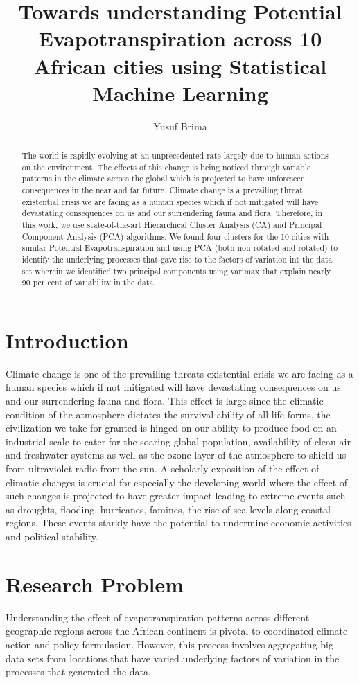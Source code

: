 \documentclass[12pt,a4paper]{article}
\author{Yusuf Brima}
\title{Towards understanding Potential Evapotranspiration across 10 African cities using Statistical Machine Learning}
\begin{document}
\maketitle
\thispagestyle{empty}
\pagebreak
\begin{abstract}
The world is rapidly evolving at an unprecedented rate largely due to human actions on the environment. The effects of  this  change is being noticed through variable patterns in the climate across the global which is projected to have unforeseen consequences in the near and far future. Climate change is a prevailing threat existential crisis we are facing as a human species which if not mitigated will have devastating consequences on us and our surrendering fauna and flora. Therefore,  in this work,  we use state-of-the-art Hierarchical Cluster Analysis (CA) and Principal Component Analysis (PCA) algorithms. We found four clusters for the 10 cities with similar Potential Evapotranspiration and using PCA (both non rotated and rotated) to identify the underlying processes that gave rise to the factors of variation int the data set wherein we identified two principal components using varimax that explain nearly 90 per cent of variability in the data. 
\end{abstract}
\pagebreak
\tableofcontents
\pagebreak
\section{Introduction}
Climate change is one of the prevailing threats existential crisis we are facing as a human species which if not mitigated will have devastating consequences on us and our surrendering fauna and flora. This effect is large since the climatic condition of the atmosphere dictates the survival ability of all life forms, the civilization we take for granted is hinged on our ability to produce food on an industrial scale to cater for the soaring global population, availability of clean air and freshwater systems as well as the ozone layer of the atmosphere to shield us from ultraviolet radio from the sun.
A scholarly exposition of the effect of climatic changes is crucial for especially the developing world where the effect of such changes is projected to have greater impact leading to extreme events such as droughts, flooding,  hurricanes, famines, the rise of sea levels along coastal regions.  These events starkly have the potential to undermine economic activities and political stability.
\section{Research Problem}
Understanding the effect of evapotranspiration patterns across different geographic regions across the African continent is pivotal to coordinated climate action and policy formulation. However, this process involves aggregating big data sets from locations that have varied underlying factors of variation in the processes that generated the data. 
\end{document}
